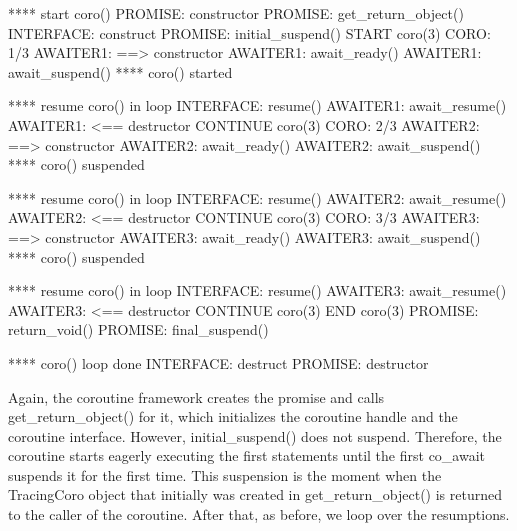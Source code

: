 \begin{shell}
**** start coro()
      PROMISE: constructor
      PROMISE: get_return_object()
        INTERFACE: construct
      PROMISE: initial_suspend()
  START coro(3)
  CORO: 1/3
          AWAITER1: ==> constructor
          AWAITER1: await_ready()
          AWAITER1: await_suspend()
**** coro() started

**** resume coro() in loop
        INTERFACE: resume()
          AWAITER1: await_resume()
          AWAITER1: <== destructor
  CONTINUE coro(3)
  CORO: 2/3
          AWAITER2: ==> constructor
          AWAITER2: await_ready()
          AWAITER2: await_suspend()
**** coro() suspended

**** resume coro() in loop
        INTERFACE: resume()
          AWAITER2: await_resume()
          AWAITER2: <== destructor
  CONTINUE coro(3)
  CORO: 3/3
          AWAITER3: ==> constructor
          AWAITER3: await_ready()
          AWAITER3: await_suspend()
**** coro() suspended

**** resume coro() in loop
        INTERFACE: resume()
          AWAITER3: await_resume()
          AWAITER3: <== destructor
  CONTINUE coro(3)
  END coro(3)
      PROMISE: return_void()
      PROMISE: final_suspend()
      
**** coro() loop done
        INTERFACE: destruct
      PROMISE: destructor
\end{shell}

Again, the coroutine framework creates the promise and calls get\_return\_object() for it, which initializes the coroutine handle and the coroutine interface. However, initial\_suspend() does not suspend. Therefore, the coroutine starts eagerly executing the first statements until the first co\_await suspends it for the first time. This suspension is the moment when the TracingCoro object that initially was created in get\_return\_object() is returned to the caller of the coroutine. After that, as before, we loop over the resumptions.









